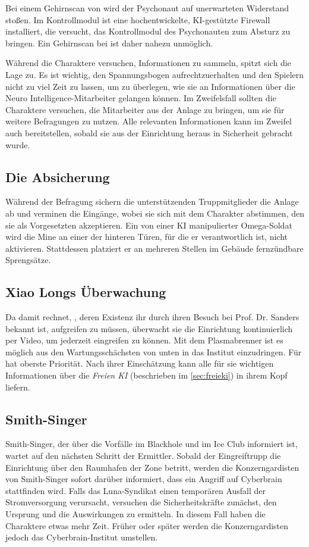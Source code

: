 Bei einem Gehirnscan von \ml{} wird der Psychonaut auf unerwarteten Widerstand stoßen. Im Kontrollmodul ist eine hochentwickelte, KI-gestützte Firewall installiert, die versucht, das Kontrollmodul des Psychonauten zum Absturz zu bringen. Ein Gehirnscan bei \ml{} ist daher nahezu unmöglich.

\begin{remarks}
	Während die Charaktere versuchen, Informationen zu sammeln, spitzt sich die Lage zu. Es ist wichtig, den Spannungsbogen aufrechtzuerhalten und den Spielern nicht zu viel Zeit zu lassen, um zu überlegen, wie sie an Informationen über die Neuro Intelligence-Mitarbeiter gelangen können. Im Zweifelsfall sollten die Charaktere versuchen, die Mitarbeiter aus der Anlage zu bringen, um sie für weitere Befragungen zu nutzen. Alle relevanten Informationen kann im Zweifel auch \ml{} bereitstellen, sobald sie aus der Einrichtung heraus in Sicherheit gebracht wurde.
\end{remarks}

\subsection{Die Absicherung} 
Während der Befragung sichern die unterstützenden Truppmitglieder die Anlage ab und verminen die Eingänge, wobei sie sich mit dem Charakter abstimmen, den sie als Vorgesetzten akzeptieren. Ein von einer KI manipulierter Omega-Soldat wird die Mine an einer der hinteren Türen, für die er verantwortlich ist, nicht aktivieren. Stattdessen platziert er an mehreren Stellen im Gebäude fernzündbare Sprengsätze.

\subsection[\xl{}s Überwachung]{Xiao Longs Überwachung}  
Da \xl{} damit rechnet, \ml{}, deren Existenz ihr durch ihren Besuch bei Prof. Dr. Sanders bekannt ist, aufgreifen zu müssen, überwacht sie die Einrichtung kontinuierlich per Video, um jederzeit eingreifen zu können. Mit dem Plasmabrenner ist es möglich aus den Wartungsschächsten von unten in das Institut einzudringen. Für \xl{} hat \ml{} oberste Priorität. Nach ihrer Einschätzung kann \ml{} alle für sie wichtigen Informationen über die \emph{Freien KI} (beschrieben im \cref{sec:freieki}) in ihrem Kopf liefern.

\subsection{Smith-Singer} 
Smith-Singer, der über die Vorfälle im Blackhole und im Ice Club informiert ist, wartet auf den nächsten Schritt der Ermittler. Sobald der Eingreiftrupp die Einrichtung über den Raumhafen der Zone betritt, werden die Konzerngardisten von Smith-Singer sofort darüber informiert, dass ein Angriff auf Cyberbrain stattfinden wird. Falls das Luna-Syndikat einen temporären Ausfall der Stromversorgung verursacht, versuchen die Sicherheitskräfte zunächst, den Ursprung und die Auswirkungen zu ermitteln. In diesem Fall haben die Charaktere etwas mehr Zeit. Früher oder später werden die Konzerngardisten jedoch das Cyberbrain-Institut umstellen. 

